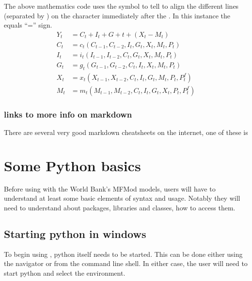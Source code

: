 \documentclass[letterpaper,10pt,english]{jupyterBook}
\begin{document}
\sphinxAtStartPar
The above  mathematics code uses the  \sphinxcode{\sphinxupquote{\&}} symbol to tell  to align the different lines (separated by \sphinxcode{\sphinxupquote{\textbackslash{}\textbackslash{}}}) on the character immediately after the \sphinxcode{\sphinxupquote{\&}}. In this instance the equals “=” sign.
\label{equation:content/04_PythonEssentials/Intro_Jupyter_notebook:aec49902-cb53-4c63-b689-989a68602faf}\begin{align}
Y_t  &=  C_t+I_t+G+t+ (X_t-M_t) \\
C_t &= c_t(C_{t-1},C_{t-2},I_t,G_t,X_t,M_t,P_t)\\
I_t &= i_t(I_{t-1},I_{t-2},C_t,G_t,X_t,M_t,P_t)\\
G_t &= g_t(G_{t-1},G_{t-2},C_t,I_t,X_t,M_t,P_t)\\
X_t &= x_t(X_{t-1},X_{t-2},C_t,I_t,G_t,M_t,P_t,P^f_t)\\
M_t &= m_t(M_{t-1},M_{t-2},C_t,I_t,G_t,X_t,P_t,P^f_t)
\end{align}

\subsection{links to more info on markdown}
\label{\detokenize{content/04_PythonEssentials/Intro_Jupyter_notebook:links-to-more-info-on-markdown}}
\sphinxAtStartPar
There are several very good markdown cheatsheets on the internet, one of these is 

\sphinxstepscope


\chapter{Some Python basics}
\label{\detokenize{content/04_PythonEssentials/PythonPandasDataframes:some-python-basics}}\label{\detokenize{content/04_PythonEssentials/PythonPandasDataframes::doc}}
\sphinxAtStartPar
Before using  with the World Bank’s MFMod models, users  will have to understand at least some basic elements of  syntax and usage.  Notably they will need to understand about packages, libraries and classes, how to access them.


\section{Starting python in windows}
\label{\detokenize{content/04_PythonEssentials/PythonPandasDataframes:starting-python-in-windows}}
\sphinxAtStartPar
To begin using , python itself needs to be started.  This can be done either using the  navigator or from the command line shell. In either case, the user will need to start python and select the  environment.
\end{document}
